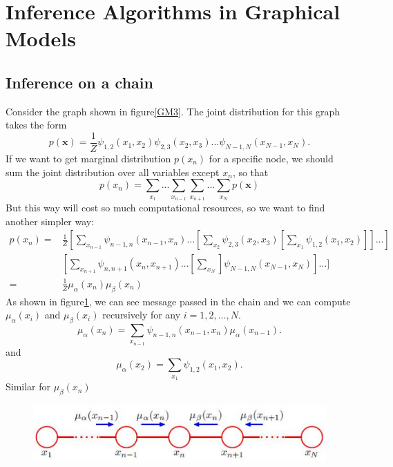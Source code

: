 \documentclass[a4paper]{book}
\renewcommand{\bf}{\mathbf}
\begin{document}
\section{Inference Algorithms in Graphical Models}
\subsection{Inference on a chain}
Consider the graph shown in figure\ref{GM3}. The joint distribution for this graph takes the form
\begin{equation}\label{eq8.16}
  p(\bf x) = \frac{1}{Z}\psi_{1,2}(x_1,x_2)\psi_{2,3}(x_2,x_3)...\psi_{N-1,N}(x_{N-1},x_N).
\end{equation}
If we want to get marginal distribution $p(x_n)$ for a specific node, we should sum the joint distribution over all variables except $x_n$, so that
\begin{equation}\label{eq8.17}
  p(x_n) = \sum_{x_1}...\sum_{x_{n-1}}\sum_{x_{n+1}}...\sum_{x_N}p(\bf x)
\end{equation}
But this way will cost so much computational resources, so we want to find another simpler way:
\begin{align}\label{eq8.18}
  p(x_n) =  & \frac{1}{Z}[\sum_{x_{n-1}}\psi_{n-1,n}(x_{n-1},x_n)\dots[\sum_{x_2}\psi_{2,3}(x_2,x_3)[\sum_{x_1}\psi_{1,2}(x_1,x_2)]]\dots] \\
   & [\sum_{x_{n+1}}\psi_{n,n+1}(x_n,x_{n+1})\dots[\sum_{x_N}]\psi_{N-1,N}(x_{N-1},x_{N})]\dots]  \\
   = & \frac{1}{Z}\mu_{\alpha}(x_n)\mu_{\beta}(x_n)
\end{align}
As shown in figure\ref{GM4}, we can see message passed in the chain and we can compute $\mu_{\alpha}(x_i)$ and $\mu_{\beta}(x_i)$ recursively for any $i=1, 2, \dots, N$.
\begin{equation}\label{eq8.19}
  \mu_{\alpha}(x_n) = \sum_{x_{n-1}}\psi_{n-1,n}(x_{n-1},x_n)\mu_{\alpha}(x_{n-1}).
\end{equation}
and
\begin{equation}\label{eq8.20}
  \mu_{\alpha}(x_2) = \sum_{x_1}\psi_{1,2}(x_1,x_2).
\end{equation}
Similar for $\mu_{\beta}(x_n)$
\begin{figure}[bth]
  \centering
  \includegraphics[width=\textwidth]{./imgs/GM4.eps}
  \caption{}\label{GM4}
\end{figure}
\end{document}
